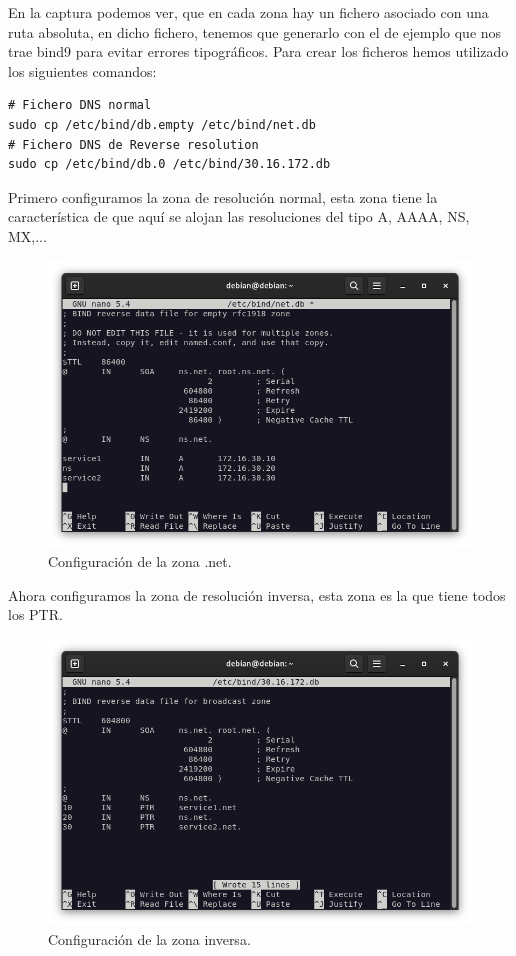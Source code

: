 En la captura podemos ver, que en cada zona hay un fichero asociado con una ruta absoluta, en dicho fichero, tenemos que generarlo con el de ejemplo que nos trae bind9 para evitar errores tipográficos. Para crear los ficheros hemos utilizado los siguientes comandos:

\begin{lstlisting}[style=mybash]
# Fichero DNS normal
sudo cp /etc/bind/db.empty /etc/bind/net.db
# Fichero DNS de Reverse resolution
sudo cp /etc/bind/db.0 /etc/bind/30.16.172.db
\end{lstlisting}

Primero configuramos la zona de resolución normal, esta zona tiene la característica de que aquí se alojan las resoluciones del tipo A, AAAA, NS, MX,...

\begin{figure}[H]
	\centering
	\includegraphics[scale=0.30]{05}
	\caption{Configuración de la zona .net.}
\end{figure}

Ahora configuramos la zona de resolución inversa, esta zona es la que tiene todos los PTR.

\begin{figure}[H]
	\centering
	\includegraphics[scale=0.30]{06}
	\caption{Configuración de la zona inversa.}
\end{figure}

